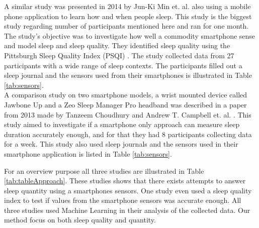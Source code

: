 \documentclass[12pt]{article} %
\begin{document}
A similar study was presented in 2014 by Jun-Ki Min et. al. \cite{toss} also using a mobile phone application to learn how and when people sleep. This study is the biggest study regarding number of participants mentioned here and ran for one month. The study's objective was to investigate how well a commodity smartphone sense and model sleep and sleep quality. They identified sleep quality using the Pittsburgh Sleep Quality Index (PSQI) \cite{quality}. The study collected data from 27 participants with a wide range of sleep contexts.  The participants filled out a sleep journal and the sensors used from their smartphones is illustrated in Table \ref{tab:sensors}. \\

A comparison study on two smartphone models, a wrist mounted device called Jawbone Up and a Zeo Sleep Manager Pro headband was described in a paper from 2013 made by Tanzeem Choudhury and Andrew T. Campbell et. al. \cite{compare}. This study aimed to investigate if a smartphone only approach can measure sleep duration accurately enough, and for that they had 8 participants collecting data for a week. This study also used sleep journals and the sensors used in their smartphone application is listed in Table \ref{tab:sensors}. 

For an overview purpose all three studies are illustrated in Table \ref{tab:tableApproach}. These studies shows that there exists attempts to answer sleep quantity using a smartphones sensors. One study even used a sleep quality index to test if values from the smartphone sensors was accurate enough. All three studies used Machine Learning in their analysis of the collected data. Our method focus on both sleep quality and quantity. 
\end{document}
